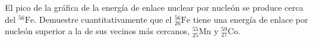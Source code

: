 \item El pico de la gráfica de la energía de enlace nuclear por nucleón se produce cerca del $^{56}\text{Fe}$. Demuestre cuantitativamente que el $^{56}_{26}\text{Fe}$ tiene una energía de enlace por nucleón superior a la de sus vecinos más cercanos, $^{55}_{25}\text{Mn}$ y $^{59}_{27}\text{Co}$.